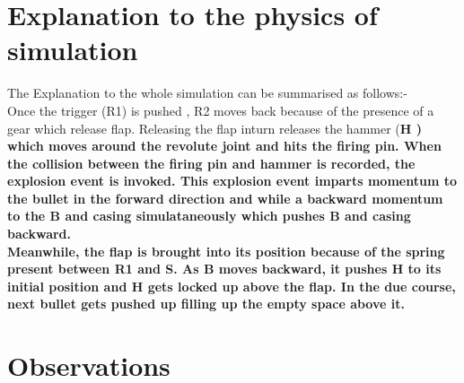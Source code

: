 \documentclass[11pt]{article}
\begin{document}
\section{Explanation to the physics of simulation}
The Explanation to the whole simulation can be summarised as follows:-\\
    Once the trigger (R1) is pushed , R2 moves back because of the presence of a gear which release flap. Releasing the flap inturn releases the hammer (\bf H \rm) which moves around the revolute joint and hits the firing pin. When the collision between the firing pin and hammer is recorded, the explosion event is invoked. This explosion event imparts momentum to the bullet in the forward direction and while a backward momentum to the B and casing simulataneously which pushes B and casing backward. \\ Meanwhile, the flap is brought into its position because of the spring present between \bf R1 \rm and \bf S. \rm As B moves backward, it pushes H to its initial position and H gets locked up above the flap. In the due course, next bullet gets pushed up filling up the empty space above it.
\section{Observations}
\end{document}
